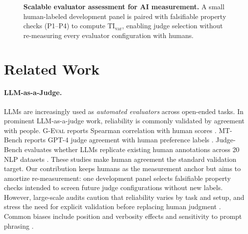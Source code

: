 \documentclass{article}
\begin{document}
\begin{figure}[t]
  \centering
  \resizebox{0.68\linewidth}{!}{}
  \caption{\textbf{Scalable evaluator assessment for AI measurement.} A small human-labeled development panel is paired with falsifiable property checks (P1--P4) to compute \(\mathrm{TI}_{\mathrm{var}}\), enabling judge selection without re-measuring every evaluator configuration with humans.}
  \label{fig:certjudge_overview}
\end{figure}

\section{Related Work}
\paragraph{LLM-as-a-Judge.}
LLMs are increasingly used as \emph{automated evaluators} across open-ended tasks.
In prominent LLM-as-a-judge work, reliability is commonly validated by agreement with people.
\textsc{G-Eval} reports Spearman correlation with human scores \citep{Liu2023GEval}.
MT-Bench reports GPT-4 judge agreement with human preference labels \citep{Zheng2023MTBench}.
Judge-Bench evaluates whether LLMs replicate existing human annotations across 20 NLP datasets \citep{Kocmi2024HumanVsLLM}.
These studies make human agreement the standard validation target.
Our contribution keeps humans as the measurement anchor but aims to amortize re-measurement: one development panel selects falsifiable property checks intended to screen future judge configurations without new labels.
However, large-scale audits caution that reliability varies by task and setup, and stress the need for explicit validation before replacing human judgment \citep{Kocmi2024HumanVsLLM,Li2024TrustLLMJudgments}.
Common biases include position and verbosity effects and sensitivity to prompt phrasing \citep{Zheng2023MTBench,Li2024TrustLLMJudgments}.
\end{document}
